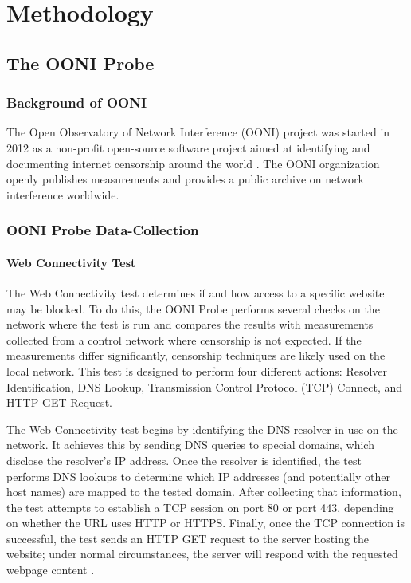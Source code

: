 \chapter{Methodology}

\section{The OONI Probe}

\subsection{Background of OONI}

The Open Observatory of Network Interference (OONI) project was started in 2012 as a non-profit open-source software project aimed at identifying and documenting internet censorship around the world \cite{ooniAbout}. The OONI organization openly publishes measurements and provides a public archive on network interference worldwide. 

\subsection{OONI Probe Data-Collection}

\subsubsection{Web Connectivity Test}

The Web Connectivity test determines if and how access to a specific website may be blocked. To do this, the OONI Probe performs several checks on the network where the test is run and compares the results with measurements collected from a control network where censorship is not expected. If the measurements differ significantly, censorship techniques are likely used on the local network. This test is designed to perform four different actions: Resolver Identification, DNS Lookup, Transmission Control Protocol (TCP) Connect, and HTTP GET Request.

The Web Connectivity test begins by identifying the DNS resolver in use on the network. It achieves this by sending DNS queries to special domains, which disclose the resolver’s IP address. Once the resolver is identified, the test performs DNS lookups to determine which IP addresses (and potentially other host names) are mapped to the tested domain. After collecting that information, the test attempts to establish a TCP session on port 80 or port 443, depending on whether the URL uses HTTP or HTTPS. Finally, once the TCP connection is successful, the test sends an HTTP GET request to the server hosting the website; under normal circumstances, the server will respond with the requested webpage content \cite{ooniConnectivityTest}.

